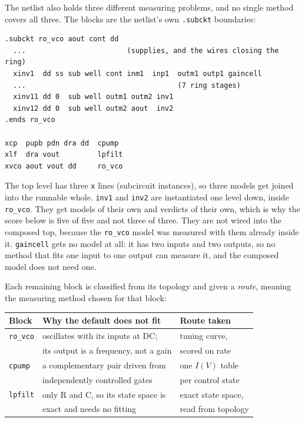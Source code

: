 \documentclass[11pt,a4paper]{article}
\begin{document}
The netlist also holds three different measuring problems, and no
single method covers all three. The blocks are the netlist's own
\texttt{.subckt} boundaries:

\begin{lstlisting}
.subckt ro_vco aout cont dd
  ...                        (supplies, and the wires closing the ring)
  xinv1  dd ss sub well cont inm1  inp1  outm1 outp1 gaincell
  ...                                    (7 ring stages)
  xinv11 dd 0  sub well outm1 outm2 inv1
  xinv12 dd 0  sub well outm2 aout  inv2
.ends ro_vco

xcp  pupb pdn dra dd  cpump
xlf  dra vout         lpfilt
xvco aout vout dd     ro_vco
\end{lstlisting}

\noindent The top level has three \texttt{x} lines (subcircuit
instances), so three models get joined into the runnable whole.
\texttt{inv1} and \texttt{inv2} are instantiated one level down,
inside \texttt{ro\_vco}. They get models of their own and verdicts of
their own, which is why the score below is five of five and not three
of three. They are not wired into the composed top, because the
\texttt{ro\_vco} model was measured with them already inside it.
\texttt{gaincell} gets no model at all: it has two inputs and two
outputs, so no method that fits one input to one output can measure
it, and the composed model does not need one.

Each remaining block is classified from its topology and given a
\emph{route}, meaning the measuring method chosen for that block:

\begin{center}
\begin{tabular}{@{}lll@{}}
\toprule
\textbf{Block} & \textbf{Why the default does not fit} & \textbf{Route taken} \\
\midrule
\texttt{ro\_vco} & oscillates with its inputs at DC;
                   & tuning curve, \\
                 & its output is a frequency, not a gain
                   & scored on rate \\
\texttt{cpump}   & a complementary pair driven from
                   & one $I(V)$ table \\
                 & independently controlled gates
                   & per control state \\
\texttt{lpfilt}  & only R and C, so its state space is
                   & exact state space, \\
                 & exact and needs no fitting
                   & read from topology \\
\bottomrule
\end{tabular}
\end{center}
\end{document}
